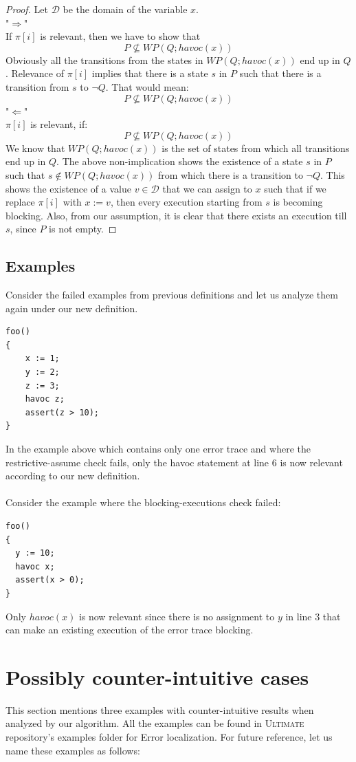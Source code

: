 \documentclass{article}
\newcommand{\ultimate}{\textsc{Ultimate}\xspace} %
\begin{document}
\begin{proof}
Let $\mathcal{D}$ be the domain of the variable $x$. \\
"$\Rightarrow$"\\
If $\pi[i]$ is relevant, then we have to show that\\
$$P \not \subseteq WP(Q;havoc(x))$$
Obviously all the transitions from the states in $WP(Q;havoc(x))$ end up in $Q$. Relevance of $\pi[i]$ implies that there is a state $s$ in $P$ such that there is a transition from $s$ to $\neg Q$. That would mean:
$$P \not \subseteq WP(Q;havoc(x))$$
"$\Leftarrow$"\\
$\pi[i]$ is relevant, if:
$$P \not \subseteq WP(Q;havoc(x))$$
We know that $WP(Q;havoc(x))$ is the set of states from which all transitions end up in $Q$. The above non-implication shows the existence of a state $s$ in $P$ such that $s \not \in WP(Q; havoc(x))$  from which there is a transition to $\neg Q$. This shows the existence of a value $v \in \mathcal{D}$ that we can assign to $x$ such that if we replace $\pi[i]$ with $x:=v$, then every execution starting from $s$ is becoming blocking. Also, from our assumption, it is clear that there exists an execution till $s$, since $P$ is not empty.
\end{proof}

\subsection{Examples}
Consider the failed examples from previous definitions and let us analyze them again under our new definition.
\begin{lstlisting}
foo()
{
	x := 1;
	y := 2;
	z := 3;
	havoc z;
	assert(z > 10);
}
\end{lstlisting}
In the example above which contains only one error trace and where the restrictive-assume check fails, only the havoc statement at line 6 is now relevant according to our new definition. \\
\\
Consider the example where the blocking-executions check failed:
\begin{lstlisting}
foo()
{
  y := 10;
  havoc x;
  assert(x > 0);
}
\end{lstlisting}
Only $havoc(x)$ is now relevant since there is no assignment to $y$ in line 3 that can make an existing execution of the error trace blocking.


\section{Possibly counter-intuitive cases}
This section mentions three examples with  counter-intuitive results when analyzed by our algorithm. All the examples can be found in \ultimate repository's examples folder for Error localization. For future reference, let us name these examples as follows:
\end{document}
